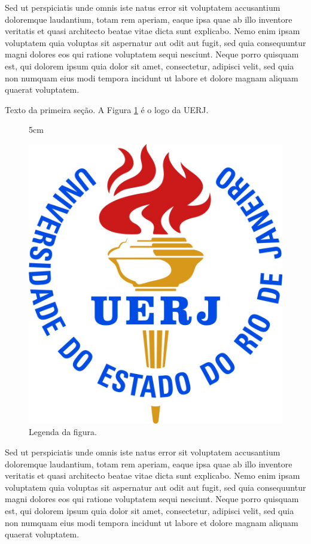 Sed ut perspiciatis unde omnis iste natus error sit voluptatem accusantium doloremque laudantium, totam rem aperiam, eaque ipsa quae ab illo inventore veritatis et quasi architecto beatae vitae dicta sunt explicabo. Nemo enim ipsam voluptatem quia voluptas sit aspernatur aut odit aut fugit, sed quia consequuntur magni dolores eos qui ratione voluptatem sequi nesciunt. Neque porro quisquam est, qui dolorem ipsum quia dolor sit amet, consectetur, adipisci velit, sed quia non numquam eius modi tempora incidunt ut labore et dolore magnam aliquam quaerat voluptatem.



Texto da primeira seção. A Figura \ref{rotulo} é o logo da UERJ. 

\begin{figure}[!h]{5cm}
	\caption{Legenda da figura.} \label{rotulo}
	\includegraphics[width=\hsize]{Figures/logo_uerj_cor.jpg}
\end{figure}

Sed ut perspiciatis unde omnis iste natus error sit voluptatem accusantium doloremque laudantium, totam rem aperiam, eaque ipsa quae ab illo inventore veritatis et quasi architecto beatae vitae dicta sunt explicabo. Nemo enim ipsam voluptatem quia voluptas sit aspernatur aut odit aut fugit, sed quia consequuntur magni dolores eos qui ratione voluptatem sequi nesciunt. Neque porro quisquam est, qui dolorem ipsum quia dolor sit amet, consectetur, adipisci velit, sed quia non numquam eius modi tempora incidunt ut labore et dolore magnam aliquam quaerat voluptatem.

